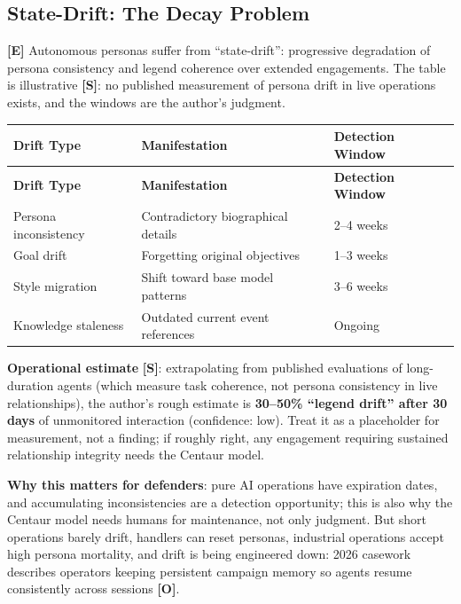 \documentclass[11pt,letterpaper]{article}
\begin{document}
\subsection{State-Drift: The Decay Problem}

\textbf{[E]} Autonomous personas suffer from ``state-drift'': progressive degradation of persona consistency and legend coherence over extended engagements. The table is illustrative \textbf{[S]}: no published measurement of persona drift in live operations exists, and the windows are the author's judgment.

{\small
\begin{longtable}{L{3.5cm}L{5cm}L{3cm}}
\toprule
\textbf{Drift Type} & \textbf{Manifestation} & \textbf{Detection Window} \\
\midrule
\endfirsthead
\toprule
\textbf{Drift Type} & \textbf{Manifestation} & \textbf{Detection Window} \\
\midrule
\endhead
Persona inconsistency & Contradictory biographical details & 2--4 weeks \\*
Goal drift & Forgetting original objectives & 1--3 weeks \\
Style migration & Shift toward base model patterns & 3--6 weeks \\*
Knowledge staleness & Outdated current event references & Ongoing \\
\bottomrule
\end{longtable}}

\textbf{Operational estimate} \textbf{[S]}: extrapolating from published evaluations of long-duration agents (which measure task coherence, not persona consistency in live relationships), the author's rough estimate is \textbf{30--50\% ``legend drift'' after 30 days} of unmonitored interaction (confidence: low). Treat it as a placeholder for measurement, not a finding; if roughly right, any engagement requiring sustained relationship integrity needs the Centaur model.

\textbf{Why this matters for defenders}: pure AI operations have expiration dates, and accumulating inconsistencies are a detection opportunity; this is also why the Centaur model needs humans for maintenance, not only judgment. But short operations barely drift, handlers can reset personas, industrial operations accept high persona mortality, and drift is being engineered down: 2026 casework describes operators keeping persistent campaign memory so agents resume consistently across sessions \textbf{[O]}.

\end{document}
